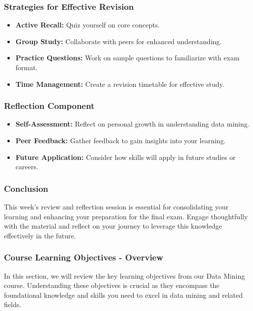 \documentclass{beamer}
\begin{document}
\begin{frame}[fragile]
    \frametitle{Strategies for Effective Revision}
    \begin{itemize}
        \item \textbf{Active Recall:} Quiz yourself on core concepts.
        \item \textbf{Group Study:} Collaborate with peers for enhanced understanding.
        \item \textbf{Practice Questions:} Work on sample questions to familiarize with exam format.
        \item \textbf{Time Management:} Create a revision timetable for effective study.
    \end{itemize}
\end{frame}

\begin{frame}[fragile]
    \frametitle{Reflection Component}
    \begin{itemize}
        \item \textbf{Self-Assessment:} Reflect on personal growth in understanding data mining.
        \item \textbf{Peer Feedback:} Gather feedback to gain insights into your learning.
        \item \textbf{Future Application:} Consider how skills will apply in future studies or careers.
    \end{itemize}
\end{frame}

\begin{frame}[fragile]
    \frametitle{Conclusion}
    This week’s review and reflection session is essential for consolidating your learning and enhancing your preparation for the final exam. Engage thoughtfully with the material and reflect on your journey to leverage this knowledge effectively in the future.
\end{frame}

\begin{frame}[fragile]
    \frametitle{Course Learning Objectives - Overview}
    In this section, we will review the key learning objectives from our Data Mining course. 
    Understanding these objectives is crucial as they encompass the foundational knowledge and skills you need to excel in data mining and related fields.
\end{frame}
\end{document}
